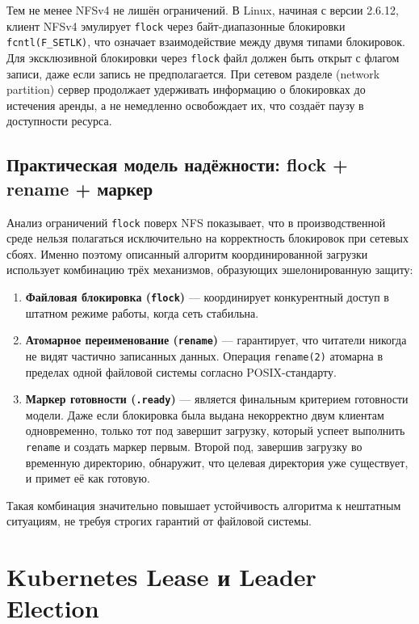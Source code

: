 Тем не менее NFSv4 не лишён ограничений. В Linux, начиная с версии 2.6.12, клиент NFSv4 эмулирует \texttt{flock} через байт-диапазонные блокировки \texttt{fcntl(F\_SETLK)}, что означает взаимодействие между двумя типами блокировок. Для эксклюзивной блокировки через \texttt{flock} файл должен быть открыт с флагом записи, даже если запись не предполагается. При сетевом разделе (network partition) сервер продолжает удерживать информацию о блокировках до истечения аренды, а не немедленно освобождает их, что создаёт паузу в доступности ресурса.

\subsection*{Практическая модель надёжности: flock + rename + маркер}

Анализ ограничений \texttt{flock} поверх NFS показывает, что в производственной среде нельзя полагаться исключительно на корректность блокировок при сетевых сбоях. Именно поэтому описанный алгоритм координированной загрузки использует комбинацию трёх механизмов, образующих эшелонированную защиту:

\begin{enumerate}[leftmargin=*]
  \item \textbf{Файловая блокировка (\texttt{flock})} --- координирует конкурентный доступ в штатном режиме работы, когда сеть стабильна.
  \item \textbf{Атомарное переименование (\texttt{rename})} --- гарантирует, что читатели никогда не видят частично записанных данных. Операция \texttt{rename(2)} атомарна в пределах одной файловой системы согласно POSIX-стандарту.
  \item \textbf{Маркер готовности (\texttt{.ready})} --- является финальным критерием готовности модели. Даже если блокировка была выдана некорректно двум клиентам одновременно, только тот под завершит загрузку, который успеет выполнить \texttt{rename} и создать маркер первым. Второй под, завершив загрузку во временную директорию, обнаружит, что целевая директория уже существует, и примет её как готовую.
\end{enumerate}

Такая комбинация значительно повышает устойчивость алгоритма к нештатным ситуациям, не требуя строгих гарантий от файловой системы.

\section{Kubernetes Lease и Leader Election}

